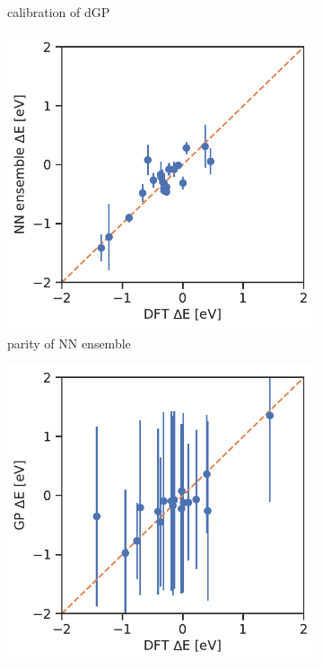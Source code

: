 \documentclass[]{achemso}
\begin{document}
\begin{figure}
\begin{subfigure}[b]{0.32\textwidth}
        \caption{calibration of \gls{dGP}}\label{fig:calibration_example_pfgp}
    \end{subfigure}
    \begin{subfigure}[b]{0.32\textwidth}
        \includegraphics[width=\textwidth]{../NN_ensemble/error_bar_parity.pdf}
        \caption{parity of \gls{NN} ensemble}\label{fig:error_bar_ensemble}
    \end{subfigure}
    \begin{subfigure}[b]{0.32\textwidth}
        \includegraphics[width=\textwidth]{../GP/Matern/error_bar_parity.pdf}

\end{subfigure}
\end{figure}
\end{document}
